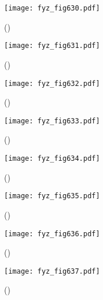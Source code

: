 {    \begin{figure}[ht!] %
      \centering
      \texttt{[image: fyz\_fig630.pdf]}
      \caption{
               (\cite[s.~707]{Feynman02})}
      \label{fyz_fig630}
    \end{figure}

    \begin{figure}[ht!] %
      \centering
      \texttt{[image: fyz\_fig631.pdf]}
      \caption{
               (\cite[s.~707]{Feynman02})}
      \label{fyz_fig631}
    \end{figure}

    \begin{figure}[ht!] %
      \centering
      \texttt{[image: fyz\_fig632.pdf]}
      \caption{
               (\cite[s.~707]{Feynman02})}
      \label{fyz_fig632}
    \end{figure}

    \begin{figure}[ht!] %
      \centering
      \texttt{[image: fyz\_fig633.pdf]}
      \caption{
               (\cite[s.~707]{Feynman02})}
      \label{fyz_fig633}
    \end{figure}

    \begin{figure}[ht!] %
      \centering
      \texttt{[image: fyz\_fig634.pdf]}
      \caption{
               (\cite[s.~707]{Feynman02})}
      \label{fyz_fig634}
    \end{figure}

    \begin{figure}[ht!] %
      \centering
      \texttt{[image: fyz\_fig635.pdf]}
      \caption{
               (\cite[s.~707]{Feynman02})}
      \label{fyz_fig635}
    \end{figure}

    \begin{figure}[ht!] %
      \centering
      \texttt{[image: fyz\_fig636.pdf]}
      \caption{
               (\cite[s.~707]{Feynman02})}
      \label{fyz_fig636}
    \end{figure}

    \begin{figure}[ht!] %
      \centering
      \texttt{[image: fyz\_fig637.pdf]}
      \caption{
               (\cite[s.~707]{Feynman02})}
      \label{fyz_fig637}
    \end{figure}

}
